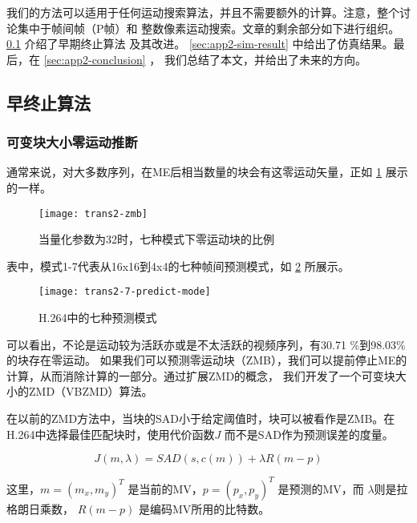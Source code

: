 我们的方法可以适用于任何运动搜索算法，并且不需要额外的计算。注意，整个讨论集中于帧间帧（P帧）和
整数像素运动搜索。文章的剩余部分如下进行组织。 \ref{sec:app2-early-termination} 介绍了早期终止算法
及其改进。 \ref{sec:app2-sim-result} 中给出了仿真结果。最后，在 \ref{sec:app2-conclusion} ，
我们总结了本文，并给出了未来的方向。

\subsection{早终止算法}
\label{sec:app2-early-termination}

\subsubsection{可变块大小零运动推断}

通常来说，对大多数序列，在ME后相当数量的块会有这零运动矢量，正如 \ref{fig:trans2-zmb} 展示的一样。


\begin{figure}[H] %
  \centering
  \texttt{[image: trans2-zmb]}
  \caption{当量化参数为32时，七种模式下零运动块的比例}
  \label{fig:trans2-zmb}
\end{figure}

表中，模式1-7代表从16x16到4x4的七种帧间预测模式，如 \ref{fig:trans2-7-predict-mode} 所展示。

\begin{figure}[H] %
  \centering
  \texttt{[image: trans2-7-predict-mode]}
  \caption{H.264中的七种预测模式}
  \label{fig:trans2-7-predict-mode}
\end{figure}

可以看出，不论是运动较为活跃亦或是不太活跃的视频序列，有30.71 \%到98.03\%的块存在零运动。
如果我们可以预测零运动块（ZMB），我们可以提前停止ME的计算，从而消除计算的一部分。通过扩展ZMD的概念，
我们开发了一个可变块大小的ZMD（VBZMD）算法。

在以前的ZMD方法中，当块的SAD小于给定阈值时，块可以被看作是ZMB。在H.264中选择最佳匹配块时，使用代价函数$J$
而不是SAD作为预测误差的度量。

\begin{equation}
\label{eq2-cost}
J(m, \lambda) = SAD (s, c(m)) + \lambda R(m - p)
\end{equation}

这里，$m = (m_x, m_y)^T$ 是当前的MV，$p = (p_x, p_y)^T$ 是预测的MV，而 $ \lambda $则是拉格朗日乘数，
$ R(m - p) $ 是编码MV所用的比特数。

